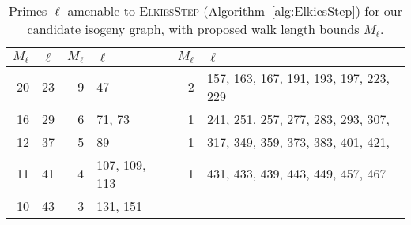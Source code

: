 \documentclass{llncs}
\newcommand{\algstyle}[1]{\textsc{#1}}
\begin{document}
\begin{table}
    \centering
    \begin{tabular}{r@{\;}|@{\;}l@{\;}||@{\;}r@{\;}|@{\;}l@{\;}||@{\;}r@{\;}|@{\;}l@{\;}}
        $M_\ell$ & $\ell$
        &
        $M_\ell$ & $\ell$
        &
        $M_\ell$ & $\ell$
        \\
        \hline
        20 & 23
        &
        9  & 47
        &
        2  & 157, 163, 167, 191, 193, 197, 223, 229
        \\
        16 & 29
        &
        6  & 71, 73
        &
        1  & 241, 251, 257, 277, 283, 293, 307,
        \\
        12 & 37
        &
        5  & 89
        &
        1  & 317, 349, 359, 373, 383, 401, 421,
        \\
        11 & 41
        &
        4  & 107, 109, 113
        &
        1  & 431, 433, 439, 443, 449, 457, 467
        \\
        10 & 43
        &
        3  & 131, 151
        &
        \\
        \hline
    \end{tabular}
    \smallskip
    \caption{Primes $\ell$ amenable to \algstyle{ElkiesStep}
    (Algorithm~\ref{alg:ElkiesStep}) for our candidate isogeny graph, 
    with proposed walk length bounds $M_\ell$.}
    \label{tab:ElkiesSteps}
\end{table}

\end{document}
